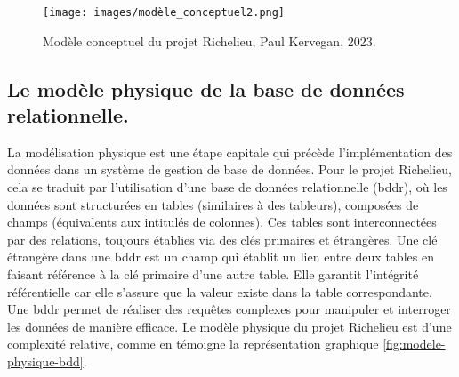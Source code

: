 \begin{figure}
    \centering
    \texttt{[image: images/modèle\_conceptuel2.png]}
    \caption{Modèle conceptuel du projet Richelieu, Paul Kervegan, 2023.}
    \label{fig:enter-label}
\end{figure}

\subsection{Le modèle physique de la base de données relationnelle.}\label{sous-section:modele-bddr}
La modélisation physique est une étape capitale qui précède l'implémentation des données dans un système de gestion de base de données. Pour le projet Richelieu, cela se traduit par l'utilisation d'une base de données relationnelle (\acrshort{bddr}), où les données sont structurées en tables (similaires à des tableurs), composées de champs (équivalents aux intitulés de colonnes). Ces tables sont interconnectées par des relations, toujours établies via des clés primaires et étrangères. Une clé étrangère dans une \acrshort{bddr} est un champ qui établit un lien entre deux tables en faisant référence à la clé primaire d'une autre table. Elle garantit l'intégrité référentielle car elle s'assure que la valeur existe dans la table correspondante. Une \acrshort{bddr} permet de réaliser des requêtes complexes pour manipuler et interroger les données de manière efficace. Le modèle physique du projet Richelieu est d'une complexité relative, comme en témoigne la représentation graphique \ref{fig:modele-physique-bdd}.
